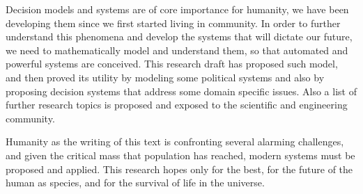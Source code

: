 Decision models and systems are of core importance for humanity, we have been developing them since we first started living in community. In order to further understand this phenomena and develop the systems that will dictate our future, we need to mathematically model and understand them, so that automated and powerful systems are conceived. This research draft has proposed such model, and then proved its utility by modeling some political systems and also by proposing decision systems that address some domain specific issues. Also a list of further research topics is proposed and exposed to the scientific and engineering community.

Humanity as the writing of this text is confronting several alarming challenges, and given the critical mass that population has reached, modern systems must be proposed and applied. This research hopes only for the best, for the future of the human as species, and for the survival of life in the universe.